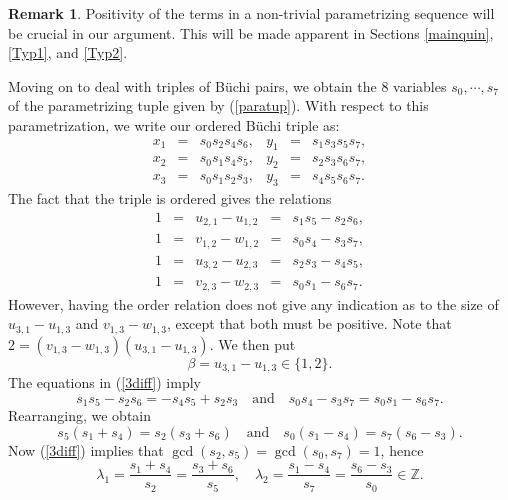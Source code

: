 \documentclass[letterpaper,10pt]{amsart}
\newcommand{\bZ}{{\mathbb{Z}}}
\theoremstyle{definition}
\newtheorem{remark}[theorem]{Remark}
\numberwithin{equation}{section}
\begin{document}
\begin{remark} Positivity of the terms in a non-trivial parametrizing sequence will be crucial in our argument. This will be made apparent in Sections \ref{mainquin}, \ref{Typ1}, and \ref{Typ2}. 
\end{remark}

Moving on to deal with triples of B\"{u}chi pairs, we obtain the $8$ variables $s_0, \cdots, s_7$ of the parametrizing tuple given by (\ref{paratup}). With respect to this parametrization, we write our ordered B\"{u}chi triple as: 
\begin{equation} \label{btrips} \begin{matrix} x_1 & = & s_0 s_2 s_4 s_6, & y_1 & = & s_1 s_3 s_5 s_7, \\
x_2 & = & s_0 s_1 s_4 s_5, & y_2 & = & s_2 s_3 s_6 s_7, \\
x_3 & = & s_0 s_1 s_2 s_3, & y_3 & = & s_4 s_5 s_6 s_7. 
\end{matrix} 
\end{equation}
The fact that the triple is ordered gives the relations 
\begin{equation} \label{3diff} \begin{matrix} 1 & = & u_{2,1}  -  u_{1,2} & = & s_1 s_5 - s_2 s_6, \\
1 & = & v_{1,2} - w_{1,2} & = & s_0 s_4 - s_3 s_7, \\
1 & = & u_{3,2} - u_{2,3} & = & s_2 s_3 - s_4 s_5, \\
1 & = & v_{2,3} - w_{2,3} & = & s_0 s_1 - s_6 s_7.
\end{matrix} 
\end{equation}
However, having the order relation does not give any indication as to the size of $u_{3,1} - u_{1,3}$ and $v_{1,3} - w_{1,3}$, except that both must be positive. Note that $2 = (v_{1,3} - w_{1,3})(u_{3,1} - u_{1,3})$. We then put 
\begin{equation} \label{beta} \beta = u_{3,1} - u_{1,3} \in \{1, 2\}.
\end{equation}
The equations in (\ref{3diff}) imply
\[s_1 s_5 - s_2 s_6 = -s_4 s_5 + s_2 s_3 \quad \text{and} \quad s_0 s_4 - s_3 s_7 = s_0 s_1 - s_6 s_7.\]
Rearranging, we obtain
\begin{equation} s_5 (s_1 + s_4) = s_2 (s_3 + s_6) \quad \text{and} \quad s_0 (s_1 - s_4) = s_7 (s_6 - s_3).
\end{equation}
Now (\ref{3diff}) implies that $\gcd(s_2, s_5) = \gcd(s_0, s_7) = 1$, hence 
\[\lambda_1 = \frac{s_1 + s_4}{s_2} = \frac{s_3 + s_6}{s_5}, \quad \lambda_2 = \frac{s_1 - s_4}{s_7} = \frac{s_6 - s_3}{s_0} \in \bZ.\]
\end{document}
